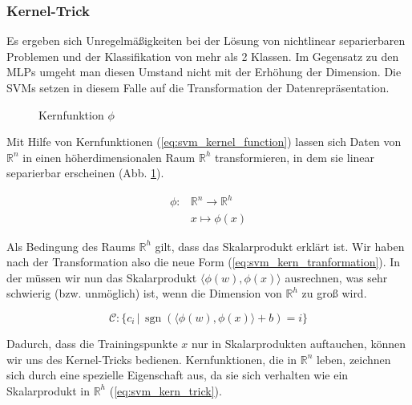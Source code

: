 \subsubsection{Kernel-Trick}
Es ergeben sich Unregelmäßigkeiten bei der Lösung von nichtlinear separierbaren Problemen und der Klassifikation von mehr als 2 Klassen.
Im Gegensatz zu den MLPs umgeht man diesen Umstand nicht mit der Erhöhung der Dimension. 
Die \ac{SVM}s setzen in diesem Falle auf die Transformation der Datenrepräsentation. 

\begin{figure}[htbp] \centering
    \caption{Kernfunktion $\phi$}
    \label{fig:svm_kernel}
\end{figure}

Mit Hilfe von Kernfunktionen (\ref{eq:svm_kernel_function}) lassen sich Daten von $\mathbb{R}^n$ in einen höherdimensionalen Raum $\mathbb{R}^h$ transformieren, in dem sie linear separierbar erscheinen (Abb. \ref{fig:svm_kernel}).

\begin{equation}
\label{eq:svm_kernel_function}
\begin{split}
    \phi : & \mathbb{R}^n \to \mathbb{R}^h \\
    & x \mapsto \phi(x)
\end{split}
\end{equation}

Als Bedingung des Raums $\mathbb{R}^h$ gilt, dass das Skalarprodukt erklärt ist.
Wir haben nach der Transformation also die neue Form (\ref{eq:svm_kern_tranformation}).
In der müssen wir nun das Skalarprodukt $\langle\phi(w),\phi(x)\rangle$ ausrechnen, was sehr schwierig (bzw. unmöglich) ist, wenn die Dimension von $\mathbb{R}^h$ zu groß wird.

\begin{equation}
\label{eq:svm_kern_tranformation}
    \mathcal{C}: \{ c_i \,|\, \operatorname{sgn}(\langle \phi(w),\phi(x) \rangle + b) = i \}
\end{equation}

Dadurch, dass die Trainingspunkte $x$ nur in Skalarprodukten auftauchen, können wir uns des Kernel-Tricks bedienen.
Kernfunktionen, die in $\mathbb{R}^n$ leben, zeichnen sich durch eine spezielle Eigenschaft aus, da sie sich verhalten wie ein Skalarprodukt in $\mathbb{R}^h$ (\ref{eq:svm_kern_trick}).

